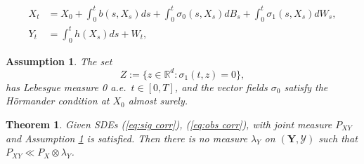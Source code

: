 \documentclass[10pt,a4paper]{amsart}
\newtheorem{assumption}{Assumption}
\newtheorem{theorem}{Theorem}
\newcommand{\ms}[1]{(\mathbf{#1},\mathcal{#1})}
\begin{document}
\begin{align}
    \label{eq:sig corr}
    X_t &= X_0 + \int_0^tb(s,X_s)ds+\int_0^t\sigma_0(s,X_s)dB_s+\int_0^t\sigma_1(s,X_s)dW_s,\\
    \label{eq:obs corr}
    Y_t &= \int_0^th(X_s)ds + W_t,
\end{align}

\begin{assumption}\label{as:hordmander's condition}
    The set
    \[
    Z := \{z \in \mathbb R^d: \sigma_1(t,z)=0\},
    \]
    has Lebesgue measure 0 a.e.\ $t\in[0,T]$, and the vector fields $\sigma_0$ satisfy the H\"ormander condition at $X_0$ almost surely.
\end{assumption}

\begin{theorem}
    Given SDEs (\ref{eq:sig corr}), (\ref{eq:obs corr}), with joint measure $P_{XY}$ and Assumption \ref{as:hordmander's condition} is satisfied. Then there is no measure $\lambda_Y$ on $\ms{Y}$ such that $P_{XY}\ll P_X\otimes \lambda_Y$.
\end{theorem}
\end{document}

